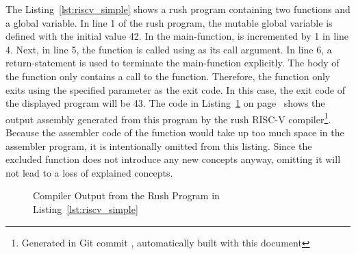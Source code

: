 The Listing~\ref{lst:riscv_simple} shows a rush program containing two functions and a global variable.
In line 1 of the rush program, the mutable global variable  is defined with the initial value 42.
In the main-function,  is incremented by 1 in line 4.
Next, in line 5, the  function is called using  as its call argument.
In line 6, a return-statement is used to terminate the main-function explicitly.
The body of the  function only contains a call to the  function.
Therefore, the  function only exits using the specified parameter  as the exit code.
In this case, the exit code of the displayed program will be 43.
The code in Listing~\ref{lst:riscv_simple_asm} on page~\pageref{lst:riscv_simple_asm} shows the output assembly generated from this program by the rush RISC-V compiler\footnote{Generated in Git commit \rushCommit, automatically built with this document}.
Because the assembler code of the  function would take up too much space in the assembler program, it is intentionally omitted from this listing.
Since the excluded function does not introduce any new concepts anyway, omitting it will not lead to a loss of explained concepts.


\begin{figure}
	\centering
	\caption{Compiler Output from the Rush Program in Listing~\ref{lst:riscv_simple}}\label{lst:riscv_simple_asm}
\end{figure}

